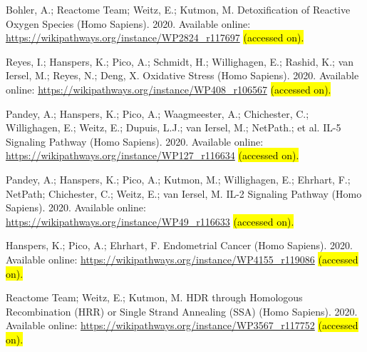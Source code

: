 \documentclass[ijms,article,accept,moreauthors,pdftex]{Definitions/mdpi}
\begin{document}
\begin{thebibliography}{999}
Bohler, A.; {Reactome Team}; Weitz, E.; Kutmon, M.
\newblock Detoxification of Reactive Oxygen Species (Homo Sapiens). 2020.
\newblock  Available online: \url{https://wikipathways.org/instance/WP2824_r117697} \hl{(accessed on). } %


Reyes, I.; Hanspers, K.; Pico, A.; Schmidt, H.; Willighagen, E.; Rashid, K.;
  van Iersel, M.; Reyes, N.; Deng, X.
\newblock Oxidative Stress (Homo Sapiens). 2020.
\newblock Available online: \url{https://wikipathways.org/instance/WP408_r106567} \hl{(accessed on). } %

Pandey, A.; Hanspers, K.; Pico, A.; Waagmeester, A.; Chichester, C.;
  Willighagen, E.; Weitz, E.; Dupuis, L.J.; van Iersel, M.; NetPath.; et al.
\newblock IL-5 Signaling Pathway (Homo Sapiens). 2020.
\newblock Available online: \url{https://wikipathways.org/instance/WP127_r116634} \hl{(accessed on). } %

Pandey, A.; Hanspers, K.; Pico, A.; Kutmon, M.; Willighagen, E.; Ehrhart, F.;
  NetPath; Chichester, C.; Weitz, E.; van Iersel, M.
\newblock IL-2 Signaling Pathway (Homo Sapiens). 2020.
\newblock Available online: \url{https://wikipathways.org/instance/WP49_r116633} \hl{(accessed on). } %

Hanspers, K.; Pico, A.; Ehrhart, F.
\newblock Endometrial Cancer (Homo Sapiens). 2020.
\newblock Available online: \url{https://wikipathways.org/instance/WP4155_r119086} \hl{(accessed on). } %

{Reactome Team}; Weitz, E.; Kutmon, M.
\newblock HDR through Homologous Recombination (HRR) or Single Strand Annealing
  (SSA) (Homo Sapiens). 2020.
\newblock Available online: \url{https://wikipathways.org/instance/WP3567_r117752} \hl{(accessed on). } %


\end{thebibliography}
\end{document}
